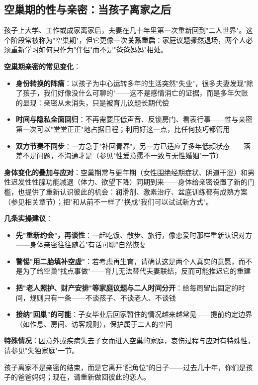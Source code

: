 \subsection{空巢期的性与亲密：当孩子离家之后}

孩子上大学、工作或成家离家后，夫妻在几十年里第一次重新回到"二人世界"。这个阶段常被称为"空巢期"，但它更像一次\textbf{关系重启}：家庭议题骤然退场，两个人必须重新学习如何只作为"伴侣"而不是"爸爸妈妈"相处。

\vspace{0.5em}
\noindent\textbf{空巢期亲密的常见变化}：

\begin{itemize}
	\item \textbf{身份转换的阵痛}：以孩子为中心运转多年的生活突然"失业"，很多夫妻发现"除了孩子，我们好像没什么可聊的"——这不是感情消亡的证据，而是多年欠账的显现：亲密从未消失，只是被育儿议题长期代偿
	\item \textbf{时间与隐私全面回归}：不再需要压低声音、反锁房门、看表行事——性与亲密第一次可以"堂堂正正"地占据日程；利用好这一点，比任何技巧都管用
	\item \textbf{双方节奏不同步}：一方急于"补回青春"，另一方已适应了多年低频状态——落差不是问题，不沟通才是（参见"性爱意愿不一致与无性婚姻"一节）
\end{itemize}

\vspace{0.5em}
\noindent\textbf{身体变化的叠加与应对}：空巢期常与更年期（女性围绝经期症状、阴道干涩）和男性迟发性性腺功能减退（体力、欲望下降）同期到来——身体给亲密设置了新的门槛，也提供了重新认识彼此的机会：润滑剂、激素治疗、盆底训练都有成熟方案（参见相关章节）；把"和从前不一样了"换成"我们可以试试新方式"。

\vspace{0.5em}
\noindent\textbf{几条实操建议}：

\begin{itemize}
	\item \textbf{先"重新约会"，再谈性}：一起吃饭、散步、旅行，像恋爱时那样重新认识对方——身体亲密往往随着"有话可聊"自然恢复
	\item \textbf{警惕"用二胎填补空虚"}：若考虑再生育，请确认这是两个人真实的意愿，而不是为了给空巢"找点事做"——育儿无法替代夫妻联结，反而可能推迟它的重建
	\item \textbf{把"老人照护、财产安排"等家庭议题与二人时间分开}：给每周留出固定的时间，规则只有一条——不谈孩子、不谈老人、不谈钱
	\item \textbf{接纳"回巢"的可能}：子女毕业后回家暂住的情况越来越常见——提前约定边界（如作息、房间、访客规则），保护属于二人的空间
\end{itemize}

\vspace{0.5em}
\noindent\textbf{特殊情况}：因意外或疾病失去子女而进入空巢的家庭，哀伤过程与应对有特殊性，请参见"失独家庭"一节。

\begin{tcolorbox}[colback=pink!5!white,colframe=red!50!black,title=贴心小叮咛]
孩子离家不是亲密的结束，而是它离开"配角位"的日子——过去几十年，你们是孩子的爸爸妈妈；现在，请重新做回彼此的恋人。
\end{tcolorbox}
